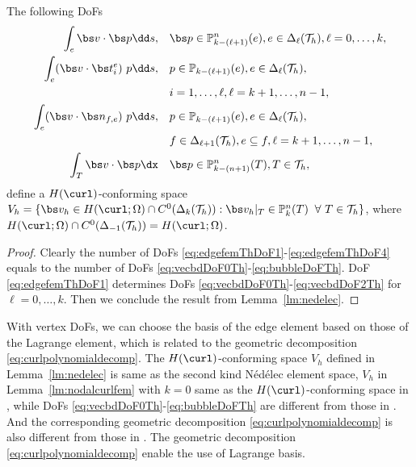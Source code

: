 \begin{lemma}\label{lm:nodalcurlfem}
The following {\rm DoFs}
\begin{align}
\int_{e}\bs v\cdot \bs p \dd s, &\quad \bs p\in  \mathbb P_{k - (\ell +1)}^n(e), e\in \Delta_{\ell}(\mathcal T_h), \ell = 0,\ldots, k, \label{eq:edgefemThDoF1} \\
\int_e (\bs v\cdot \bs t_i^e)\ p \dd s, &\quad  p\in \mathbb P_{k - (\ell +1)} (e), e\in \Delta_{\ell}(\mathcal T_h),\label{eq:edgefemThDoF2}\\
& \quad  i=1,\ldots, \ell, \ell = k+1,\ldots, n-1, \notag\\
\int_e (\bs v\cdot \bs n_{f,e})\ p \dd s, &\quad  p\in \mathbb P_{k - (\ell +1)} (e), e\in \Delta_{\ell}(\mathcal T_h), \label{eq:edgefemThDoF3}\\
& \quad f\in \Delta_{\ell+1}(\mathcal T_h), e\subseteq f, \ell = k+1,\ldots, n-1, \notag\\
\int_T \bs v \cdot \bs p \dx&\quad \bs p\in \mathbb P_{k-(n+1)}^n(T), T\in\mathcal T_h, \label{eq:edgefemThDoF4}
\end{align}
define a $H(\curl)$-conforming space $V_h=\{\bs v_h\in H(\curl; \Omega)\cap C^{0}(\Delta_k(\mathcal T_h)): \bs v_h|_T\in\mathbb P_k^n(T) \;\; \forall~T\in\mathcal T_h\}$, where $H(\curl; \Omega)\cap C^{0}(\Delta_{-1}(\mathcal T_h))=H(\curl; \Omega)$.
\end{lemma}
\begin{proof}
Clearly the number of DoFs \eqref{eq:edgefemThDoF1}-\eqref{eq:edgefemThDoF4} equals to the number of DoFs \eqref{eq:vecbdDoF0Th}-\eqref{eq:bubbleDoFTh}. DoF \eqref{eq:edgefemThDoF1} determines DoFs \eqref{eq:vecbdDoF0Th}-\eqref{eq:vecbdDoF2Th} for $\ell = 0,\ldots, k$. Then we conclude the result from Lemma~\ref{lm:nedelec}.
\end{proof}

With vertex DoFs, we can choose the basis of the edge element based on those of
the Lagrange element, which is related to the geometric decomposition
\eqref{eq:curlpolynomialdecomp}. The $H(\curl)$-conforming space $V_h$ defined
in Lemma~\ref{lm:nedelec} is same as the second kind N\'ed\'elec element space,
$V_h$ in Lemma~\ref{lm:nodalcurlfem} with $k=0$ same as the $H(\curl)$-conforming space in \cite{Christiansen;Hu;Hu:2018finite} , while DoFs \eqref{eq:vecbdDoF0Th}-\eqref{eq:bubbleDoFTh} are different from those in \cite{Nedelec1986,Christiansen;Hu;Hu:2018finite}. And the corresponding geometric decomposition \eqref{eq:curlpolynomialdecomp} is also different from those in \cite{ArnoldFalkWinther2009,ArnoldFalkWinther2006}. 
The geometric decomposition \eqref{eq:curlpolynomialdecomp} enable the use of Lagrange basis.

